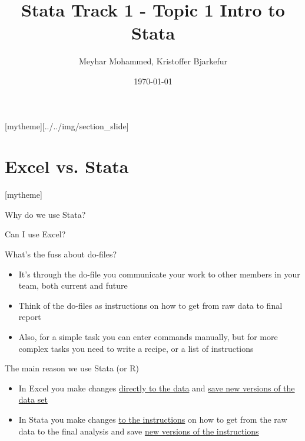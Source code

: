 \documentclass[aspectratio=169]{beamer}
\title{Stata Track 1 - Topic 1 \newline Intro to Stata}
\date{\today}
\author{Meyhar Mohammed, Kristoffer Bjarkefur} %
\institute{Development Impact Evaluation (DIME) \newline The World Bank }
\newcommand{\sectionpic}[2]{
	\setbeamertemplate{section page}[mytheme][#2]
	\section{#1}
	\setbeamertemplate{section page}[mytheme]
}
\begin{document}
{
	\maketitle
}

\sectionpic{Excel vs. Stata}{../../img/section_slide}


\begin{frame}{Why do we use Stata?}
\begin{center}
	\huge Can I use Excel?
\end{center}

\end{frame}


\begin{frame}{What's the fuss about do-files?}

\begin{itemize}
	\item It’s through the do-file you communicate your work to other members in your team, both current and future

	\item Think of the do-files as instructions on how to get from raw data to final report

	\item Also, for a simple task you can enter commands manually, but for more complex tasks you need to write a recipe, or a list of instructions

\end{itemize}
\end{frame}

\begin{frame}{The main reason we use Stata (or R)}
\begin{itemize}

	\item In Excel you make changes \underline{directly to the data} and \underline{save new versions of the data set}

	\item In Stata you make changes \underline{to the instructions} on how to get from the raw data to the final analysis and save \underline{new versions of the instructions}
\end{itemize}
\end{frame}
\end{document}
